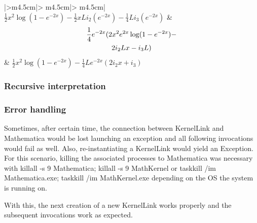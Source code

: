 \begin{tabular}{|>{\centering\arraybackslash}m{4.5cm}|>
{\centering\arraybackslash}m{4.5cm}|>
{\centering\arraybackslash}m{4.5cm}|}
\scriptsize{ $\frac{1}{2} x^2 \log \left(1-e^{-2 x}\right) - \frac{1}{2} x L i_ 2 \left(e^{-2 x}\right)-\frac{1}{4} L i_ 3 \left(e^{-2 x}\right)$ }          & \scriptsize { \begin{multline}  \frac{1}{4} e^{-2 x} (2 x^2 e^{2 x} \log (1-e^{-2 x})- \notag\\ 2 i_ 2 L x-i_ 3 L)  \end{multline} } & \scriptsize{ $\frac{1}{2} x^2 \log \left(1-e^{-2 x}\right)-\frac{1}{4} L e^{-2 x} \left(2 i_ 2 x+i_ 3\right)$ }      \\

\label{comparison_simplification}
\end{tabular}

\subsubsection{Recursive interpretation}

\subsubsection{Error handling}
Sometimes, after certain time, the connection between {\codefont KernelLink} and {\codefont Mathematica} would be lost launching an exception and all following invocations would fail as well.
Also, re-instantiating a KernelLink would yield an Exception. For this scenario, killing the associated processes to Mathematica was necessary with {\codefont killall -s 9 Mathematica; killall -s 9 MathKernel
} or {\codefont taskkill /im Mathematica.exe; taskkill /im MathKernel.exe} depending on the OS the system is running on.

With this, the next creation of a new KernelLink works properly and the subsequent invocations work as expected.

